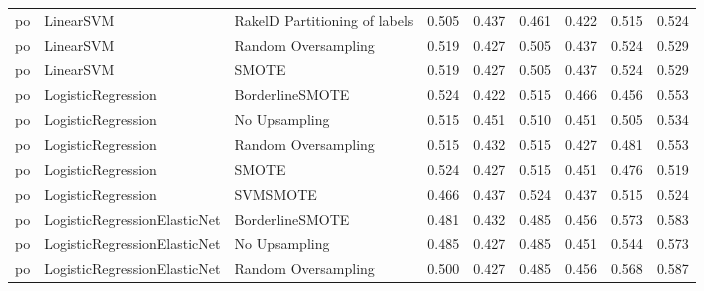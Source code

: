 \begin{tabular}{lllllllll}
      po &                       LinearSVM & RakelD Partitioning of labels & 0.505 &                     0.437 &                 0.461 &                  0.422 &                                   0.515 &     0.524 \\
      po &                       LinearSVM &           Random Oversampling & 0.519 &                     0.427 &                 0.505 &                  0.437 &                                   0.524 &     0.529 \\
      po &                       LinearSVM &                         SMOTE & 0.519 &                     0.427 &                 0.505 &                  0.437 &                                   0.524 &     0.529 \\
      po &              LogisticRegression &               BorderlineSMOTE & 0.524 &                     0.422 &                 0.515 &                  0.466 &                                   0.456 &     0.553 \\
      po &              LogisticRegression &                 No Upsampling & 0.515 &                     0.451 &                 0.510 &                  0.451 &                                   0.505 &     0.534 \\
      po &              LogisticRegression &           Random Oversampling & 0.515 &                     0.432 &                 0.515 &                  0.427 &                                   0.481 &     0.553 \\
      po &              LogisticRegression &                         SMOTE & 0.524 &                     0.427 &                 0.515 &                  0.451 &                                   0.476 &     0.519 \\
      po &              LogisticRegression &                      SVMSMOTE & 0.466 &                     0.437 &                 0.524 &                  0.437 &                                   0.515 &     0.524 \\
      po &    LogisticRegressionElasticNet &               BorderlineSMOTE & 0.481 &                     0.432 &                 0.485 &                  0.456 &                                   0.573 &     0.583 \\
      po &    LogisticRegressionElasticNet &                 No Upsampling & 0.485 &                     0.427 &                 0.485 &                  0.451 &                                   0.544 &     0.573 \\
      po &    LogisticRegressionElasticNet &           Random Oversampling & 0.500 &                     0.427 &                 0.485 &                  0.456 &                                   0.568 &     0.587 \\

\end{tabular}
